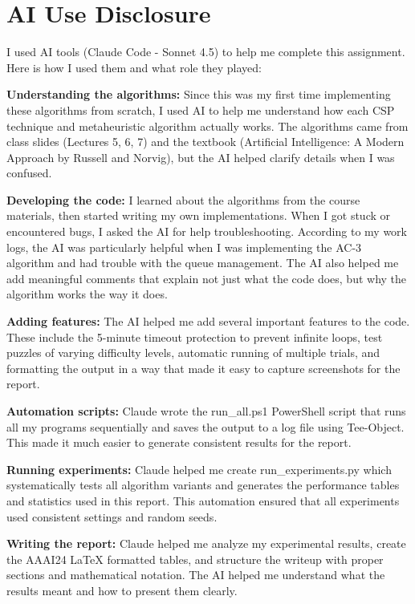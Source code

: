 \documentclass[letterpaper]{article}
\begin{document}
\section{AI Use Disclosure}

I used AI tools (Claude Code - Sonnet 4.5) to help me complete this assignment. Here is how I used them and what role they played:

\textbf{Understanding the algorithms:} Since this was my first time implementing these algorithms from scratch, I used AI to help me understand how each CSP technique and metaheuristic algorithm actually works. The algorithms came from class slides (Lectures 5, 6, 7) and the textbook (Artificial Intelligence: A Modern Approach by Russell and Norvig), but the AI helped clarify details when I was confused.

\textbf{Developing the code:} I learned about the algorithms from the course materials, then started writing my own implementations. When I got stuck or encountered bugs, I asked the AI for help troubleshooting. According to my work logs, the AI was particularly helpful when I was implementing the AC-3 algorithm and had trouble with the queue management. The AI also helped me add meaningful comments that explain not just what the code does, but why the algorithm works the way it does.

\textbf{Adding features:} The AI helped me add several important features to the code. These include the 5-minute timeout protection to prevent infinite loops, test puzzles of varying difficulty levels, automatic running of multiple trials, and formatting the output in a way that made it easy to capture screenshots for the report.

\textbf{Automation scripts:} Claude wrote the run\_all.ps1 PowerShell script that runs all my programs sequentially and saves the output to a log file using Tee-Object. This made it much easier to generate consistent results for the report.

\textbf{Running experiments:} Claude helped me create run\_experiments.py which systematically tests all algorithm variants and generates the performance tables and statistics used in this report. This automation ensured that all experiments used consistent settings and random seeds.

\textbf{Writing the report:} Claude helped me analyze my experimental results, create the AAAI24 LaTeX formatted tables, and structure the writeup with proper sections and mathematical notation. The AI helped me understand what the results meant and how to present them clearly.
\end{document}
